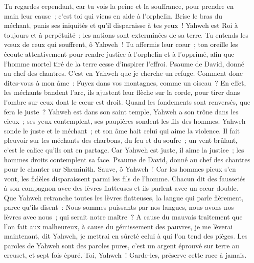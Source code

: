\begin{multicols}{2}
Tu regardes cependant, car tu vois la peine et la souffrance, pour prendre en main leur cause~; c'est toi qui viens en aide à l'orphelin.
Brise le bras du méchant, punis ses iniquités et qu'il disparaisse à tes yeux~!
Yahweh est Roi à toujours et à perpétuité~; les nations sont exterminées de sa terre.
Tu entends les vœux de ceux qui souffrent, ô Yahweh~! Tu affermis leur cœur~; ton oreille les écoute attentivement
pour rendre justice à l'orphelin et à l'opprimé, afin que l'homme mortel tiré de la terre cesse d'inspirer l'effroi.
\VerseOne{}Psaume de David, donné au chef des chantres. C'est en Yahweh que je cherche un refuge. Comment donc dites-vous à mon âme~: Fuyez dans vos montagnes, comme un oiseau~?
En effet, les méchants bandent l'arc, ils ajustent leur flèche sur la corde, pour tirer dans l'ombre sur ceux dont le cœur est droit.
Quand les fondements sont renversés, que fera le juste~?
Yahweh est dans son saint temple, Yahweh a son trône dans les cieux~; ses yeux contemplent, ses paupières sondent les fils des hommes.
Yahweh sonde le juste et le méchant~; et son âme hait celui qui aime la violence.
Il fait pleuvoir sur les méchants des charbons, du feu et du soufre~; un vent brûlant, c'est le calice qu'ils ont en partage.
Car Yahweh est juste, il aime la justice~; les hommes droits contemplent sa face.
\VerseOne{}Psaume de David, donné au chef des chantres pour le chanter sur Sheminith.
Sauve, ô Yahweh~! Car les hommes pieux s'en vont, les fidèles disparaissent parmi les fils de l'homme.
Chacun dit des faussetés à son compagnon avec des lèvres flatteuses et ils parlent avec un cœur double.
Que Yahweh retranche toutes les lèvres flatteuses, la langue qui parle fièrement,
parce qu'ils disent~: Nous sommes puissants par nos langues, nous avons nos lèvres avec nous~; qui serait notre maître~?
A cause du mauvais traitement que l'on fait aux malheureux, à cause du gémissement des pauvres, je me lèverai maintenant, dit Yahweh, je mettrai en sûreté celui à qui l'on tend des pièges.
Les paroles de Yahweh sont des paroles pures, c'est un argent éprouvé sur terre au creuset, et sept fois épuré.
Toi, Yahweh~! Garde-les, préserve cette race à jamais.

\end{multicols}
